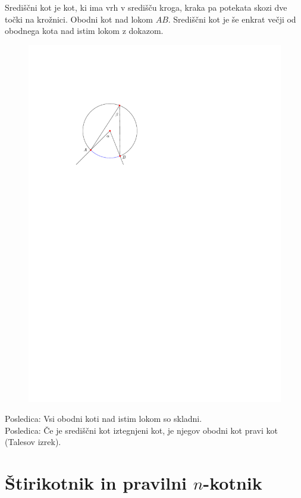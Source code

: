 \documentclass{article}
\begin{document}
Središčni kot je kot, ki ima vrh v središču kroga, kraka pa potekata skozi dve točki na krožnici. Obodni kot nad lokom $AB$. Središčni kot je še enkrat večji od obodnega kota nad istim lokom z dokazom.\\
\begin{figure}[H]
    \includegraphics[width=1\textwidth]{srediscni_kot.pdf}
    \centering
\end{figure}
Posledica: Vsi obodni koti nad istim lokom so skladni.\\
Posledica: Če je središčni kot iztegnjeni kot, je njegov obodni kot pravi kot (Talesov izrek).









\section{Štirikotnik in pravilni $n$-kotnik}
\end{document}
